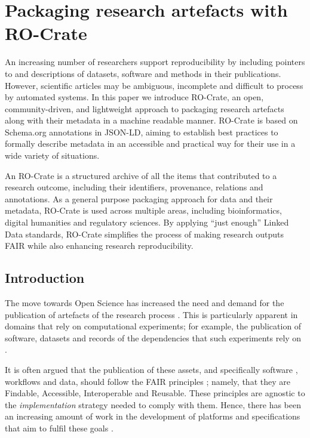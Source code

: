\section{Packaging research artefacts with RO-Crate}
\label{ch5:packaging-research-artefacts-with-ro-crate}

An increasing number of researchers support reproducibility by including
pointers to and descriptions of datasets, software and methods in their
publications. However, scientific articles may be ambiguous, incomplete
and difficult to process by automated systems. In this paper we
introduce RO-Crate, an open, community-driven, and lightweight approach
to packaging research artefacts along with their metadata in a machine
readable manner. RO-Crate is based on Schema.org annotations in JSON-LD,
aiming to establish best practices to formally describe metadata in an
accessible and practical way for their use in a wide variety of
situations.

An RO-Crate is a structured archive of all the items that contributed to
a research outcome, including their identifiers, provenance, relations
and annotations. As a general purpose packaging approach for data and
their metadata, RO-Crate is used across multiple areas, including
bioinformatics, digital humanities and regulatory sciences. By applying
``just enough'' Linked Data standards, RO-Crate simplifies the process
of making research outputs FAIR while also enhancing research
reproducibility.

\subsection{Introduction}\label{ch5:introduction}

The move towards Open Science has increased the need and demand for the
publication of artefacts of the research process
\cite{Sefton 2021}. This is
particularly apparent in domains that rely on computational experiments;
for example, the publication of software, datasets and records of the
dependencies that such experiments rely on
\cite{Stodden 2016}.

It is often argued that the publication of these assets, and
specifically software
\cite{Lamprecht 2019}, workflows
\cite{Goble 2020} and data, should
follow the FAIR principles
\cite{Wilkinson 2016}; namely, that
they are Findable, Accessible, Interoperable and Reusable. These
principles are agnostic to the \emph{implementation} strategy needed to
comply with them. Hence, there has been an increasing amount of work in
the development of platforms and specifications that aim to fulfil these
goals \cite{ch5-91}.

